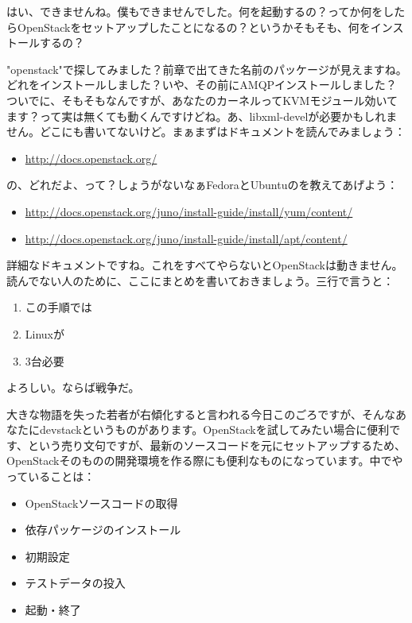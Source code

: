 \documentclass[8pt,b5paper,tombo,openany]{jsbook}
\begin{document}
はい、できませんね。僕もできませんでした。何を起動するの？ってか何をしたらOpenStackをセットアップしたことになるの？というかそもそも、何をインストールするの？

"openstack"で探してみました？前章で出てきた名前のパッケージが見えますね。どれをインストールしました？いや、その前にAMQPインストールしました？ついでに、そもそもなんですが、あなたのカーネルってKVMモジュール効いてます？って実は無くても動くんですけどね。あ、libxml-develが必要かもしれません。どこにも書いてないけど。まぁまずはドキュメントを読んでみましょう：

\begin{itemize}
  \item \url{http://docs.openstack.org/}
\end{itemize}

の、どれだよ、って？しょうがないなぁFedoraとUbuntuのを教えてあげよう：

\begin{itemize}
  \item \url{http://docs.openstack.org/juno/install-guide/install/yum/content/}
  \item \url{http://docs.openstack.org/juno/install-guide/install/apt/content/}
\end{itemize}

詳細なドキュメントですね。これをすべてやらないとOpenStackは動きません。読んでない人のために、ここにまとめを書いておきましょう。三行で言うと：

\begin{enumerate}
  \item この手順では
  \item Linuxが
  \item 3台必要
\end{enumerate}

よろしい。ならば戦争だ。

大きな物語を失った若者が右傾化すると言われる今日このごろですが、そんなあなたにdevstackというものがあります。OpenStackを試してみたい場合に便利です、という売り文句ですが、最新のソースコードを元にセットアップするため、OpenStackそのものの開発環境を作る際にも便利なものになっています。中でやっていることは：

\begin{itemize}
  \item OpenStackソースコードの取得
  \item 依存パッケージのインストール
  \item 初期設定
  \item テストデータの投入
  \item 起動・終了
\end{itemize}
\end{document}
